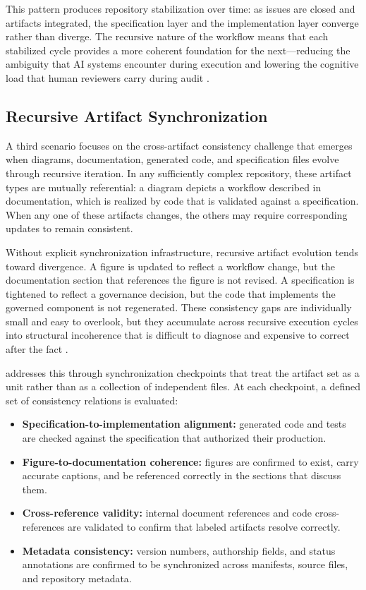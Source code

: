 This pattern produces repository stabilization over time: as issues are closed and artifacts integrated, the specification layer and the implementation layer converge rather than diverge. The recursive nature of the workflow means that each stabilized cycle provides a more coherent foundation for the next---reducing the ambiguity that AI systems encounter during execution and lowering the cognitive load that human reviewers carry during audit \cite{Sweller1988CognitiveLoad,Simon1957ModelsMan}.

\subsection{Recursive Artifact Synchronization}

A third scenario focuses on the cross-artifact consistency challenge that emerges when diagrams, documentation, generated code, and specification files evolve through recursive iteration. In any sufficiently complex repository, these artifact types are mutually referential: a diagram depicts a workflow described in documentation, which is realized by code that is validated against a specification. When any one of these artifacts changes, the others may require corresponding updates to remain consistent.

Without explicit synchronization infrastructure, recursive artifact evolution tends toward divergence. A figure is updated to reflect a workflow change, but the documentation section that references the figure is not revised. A specification is tightened to reflect a governance decision, but the code that implements the governed component is not regenerated. These consistency gaps are individually small and easy to overlook, but they accumulate across recursive execution cycles into structural incoherence that is difficult to diagnose and expensive to correct after the fact \cite{Vogels2009EventuallyConsistent}.

 addresses this through synchronization checkpoints that treat the artifact set as a unit rather than as a collection of independent files. At each checkpoint, a defined set of consistency relations is evaluated:
\begin{itemize}
  \item \textbf{Specification-to-implementation alignment:} generated code and tests are checked against the specification that authorized their production.
  \item \textbf{Figure-to-documentation coherence:} figures are confirmed to exist, carry accurate captions, and be referenced correctly in the sections that discuss them.
  \item \textbf{Cross-reference validity:} internal document references and code cross-references are validated to confirm that labeled artifacts resolve correctly.
  \item \textbf{Metadata consistency:} version numbers, authorship fields, and status annotations are confirmed to be synchronized across manifests, source files, and repository metadata.
\end{itemize}

